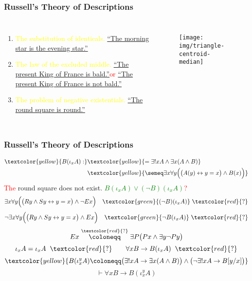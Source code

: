 \documentclass[UTF8,aspectratio=43,11pt,colorlinks,compress,openany]{beamer}%
\begin{document}
\begin{frame}\frametitle{Russell's Theory of Descriptions}
\begin{columns}
\begin{enumerate}
	\item \textcolor{yellow}{The substitution of identicals.}
	\underline{``The morning star is the evening star.''}
	\item \textcolor{yellow}{The law of the excluded middle.}
	\underline{``The present King of France is bald.''}\;\;\textcolor{red}{or}
	\underline{``The present King of France is not bald.''}
	\item \textcolor{yellow}{The problem of negative existentials.}
	\underline{``The round square is round.''}
\end{enumerate}
\begin{figure}
\texttt{[image: img/triangle-centroid-median]}
\end{figure}
\end{columns}
\end{frame}

\begin{frame}\frametitle{Russell's Theory of Descriptions}
\begin{align*}
\textcolor{yellow}{B(\iota_x A):}&\textcolor{yellow}{=\exists! x A\wedge\exists x(A\wedge B)}\\
&\textcolor{yellow}{\semeq\exists x\forall y\Big(\big(A(y)\leftrightarrow y=x\big)\wedge B(x)\Big)}
\end{align*}
\textcolor{red}{The} round square does not exist. \textcolor{green}{$B(\iota_x A)\vee(\neg B)(\iota_x A)$}\;\textcolor{red}{?}
\[\exists x\forall y\Big(\big(Ry\wedge Sy\leftrightarrow y=x\big)\wedge\neg Ex\Big)\quad\textcolor{green}{(\neg B)(\iota_x A)}\;\textcolor{red}{?}\]
\[\neg\exists x\forall y\Big(\big(Ry\wedge Sy\leftrightarrow y=x\big)\wedge Ex\Big)\quad\textcolor{green}{\neg B(\iota_x A)}\;\textcolor{red}{?}\]
\[Ex\stackrel{\textcolor{red}{?}}{\coloneqq }\exists P\big(Px\wedge\exists y\neg Py\big)\]
\[\iota_x A=\iota_x A\;\;\textcolor{red}{?}\qquad \forall x B\to B(\iota_x A)\;\;\textcolor{red}{?}\]
\[\textcolor{yellow}{B(\iota_x^y A)\coloneqq \big(\exists!x A\to\exists x(A\wedge B)\big)\wedge\big(\neg\exists!x A\to B[y/x]\big)}\]
\[\vdash\forall x B\to B(\iota_x^y A)\]
\end{frame}
\end{document}
